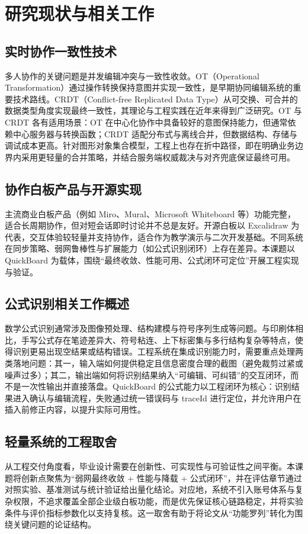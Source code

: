 \section{研究现状与相关工作}
\subsection{实时协作一致性技术}
多人协作的关键问题是并发编辑冲突与一致性收敛。OT（Operational Transformation）通过操作转换保持意图并实现一致性，是早期协同编辑系统的重要技术路线\cite{sun_ellis_1998}。CRDT（Conflict-free Replicated Data Type）从可交换、可合并的数据类型角度实现最终一致性，其理论与工程实践在近年来得到广泛研究\cite{shapiro_rr7506_2011}。OT 与 CRDT 各有适用场景：OT 在中心化协作中具备较好的意图保持能力，但通常依赖中心服务器与转换函数；CRDT 适配分布式与离线合并，但数据结构、存储与调试成本更高。针对图形对象集合模型，工程上也存在折中路径，即在明确业务边界内采用更轻量的合并策略，并结合服务端权威裁决与对齐兜底保证最终可用。

\subsection{协作白板产品与开源实现}
主流商业白板产品（例如 Miro、Mural、Microsoft Whiteboard 等）功能完整，适合长周期协作，但对短会话即时讨论并不总是友好。开源白板以 Excalidraw 为代表，交互体验较轻量并支持协作\cite{excalidraw}，适合作为教学演示与二次开发基础。不同系统在同步策略、弱网鲁棒性与扩展能力（如公式识别闭环）上存在差异。本课题以 QuickBoard 为载体，围绕“最终收敛、性能可用、公式闭环可定位”开展工程实现与验证。

\subsection{公式识别相关工作概述}
数学公式识别通常涉及图像预处理、结构建模与符号序列生成等问题。与印刷体相比，手写公式存在笔迹差异大、符号粘连、上下标密集与多行结构复杂等特点，使得识别更易出现空结果或结构错误。工程系统在集成识别能力时，需要重点处理两类落地问题：其一，输入端如何提供稳定且信息密度合理的截图（避免裁剪过紧或噪声过多）；其二，输出端如何将识别结果纳入“可编辑、可纠错”的交互闭环，而不是一次性输出并直接落盘。QuickBoard 的公式能力以工程闭环为核心：识别结果进入确认与编辑流程，失败通过统一错误码与 traceId 进行定位，并允许用户在插入前修正内容，以提升实际可用性。

\subsection{轻量系统的工程取舍}
从工程交付角度看，毕业设计需要在创新性、可实现性与可验证性之间平衡。本课题将创新点聚焦为“弱网最终收敛 + 性能与降载 + 公式闭环”，并在评估章节通过对照实验、基准测试与统计验证给出量化结论。对应地，系统不引入账号体系与复杂权限，不追求覆盖全部企业级白板功能，而是优先保证核心链路稳定，并将实验条件与评价指标参数化以支持复核。这一取舍有助于将论文从“功能罗列”转化为围绕关键问题的论证结构。

